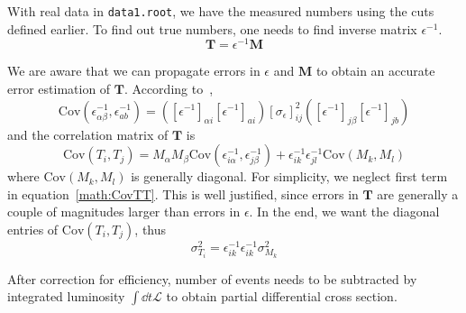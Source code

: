 With real data in \verb|data1.root|, we have the measured numbers using the cuts defined earlier. To find out true numbers, one needs to find inverse matrix $\epsilon^{-1}$.
\begin{equation}
	\mathbf{T} = \epsilon^{-1} \mathbf{M}
\end{equation}

We are aware that we can propagate errors in $\epsilon$ and $\mathbf{M}$ to obtain an accurate error estimation of $\mathbf{T}$. According to~\cite{Lefebvre:400631},
\begin{equation}
	\text{Cov}(\epsilon^{-1}_{\alpha\beta}, \epsilon^{-1}_{a b})= ([\epsilon^{-1}]_{\alpha i} [\epsilon^{-1}]_{a i}) [\sigma_{\epsilon}]^2_{ij} ([\epsilon^{-1}]_{j \beta} [\epsilon^{-1}]_{jb})
\end{equation}
and the correlation matrix of $\mathbf{T}$ is
\begin{equation}
	\text{Cov}(T_i, T_j) = M_\alpha M_\beta \text{Cov} (\epsilon^{-1}_{i\alpha}, \epsilon^{-1}_{j\beta}) + \epsilon^{-1}_{ik} \epsilon^{-1}_{jl} \text{Cov}(M_k, M_l)
	\label{math:CovTT}
\end{equation}
where $\text{Cov}(M_k, M_l)$ is generally diagonal. 
For simplicity, we neglect first term in equation~\ref{math:CovTT}. This is well justified, since errors in $\mathbf{T}$ are generally a couple of magnitudes larger than errors in $\epsilon$. In the end, we want the diagonal entries of $\text{Cov}(T_i, T_j)$, thus
\begin{equation}
	\sigma_{{T_i}}^2 = \epsilon^{-1}_{ik} \epsilon^{-1}_{ik} \sigma_{M_k}^2 
\end{equation}

After correction for efficiency, number of events needs to be subtracted by integrated luminosity $\int\dd{t} \mathcal{L}$ to obtain partial differential cross section.
